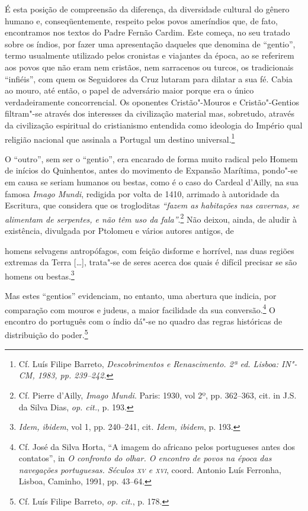 É esta posição de compreensão da diferença, da diversidade cultural
do gênero humano e, conseqüentemente, respeito pelos povos ameríndios
que, de fato, encontramos nos textos do Padre Fernão Cardim. Este
começa, no seu tratado sobre os índios, por fazer uma
apresentação daqueles que denomina de ``gentio'', termo
usualmente utilizado pelos cronistas e viajantes da época, ao se
referirem aos povos que não eram nem cristãos, nem sarracenos ou
turcos, os tradicionais ``infiéis'', com quem os Seguidores da Cruz
lutaram para dilatar a sua fé. Cabia ao mouro, até então, o papel de
adversário maior porque era o único verdadeiramente concorrencial. Os
oponentes Cristão"-Mouros e Cristão"-Gentios filtram"-se
através dos interesses da civilização material mas, sobretudo, através
da civilização espiritual do cristianismo entendida como ideologia do
Império qual religião nacional que assinala a Portugal um
destino universal.\footnote{ Cf. Luís Filipe Barreto,
\textit{Descobrimentos e Renascimento. 2ª ed. Lisboa: IN"-CM, 1983, pp. 239--242.}} 

 O ``outro'', sem ser o ``gentio'', era encarado de forma muito
radical pelo Homem de inícios do Quinhentos, antes do movimento
de Expansão Marítima, pondo"-se em causa se seriam humanos ou bestas,
como é o caso do Cardeal d'Ailly, na sua famosa \textit{Imago Mundi}, 
redigida por volta de 1410, arrimado à autoridade da Escritura, que 
considera que os trogloditas \textit{``fazem as habitações nas cavernas, se
alimentam de serpentes, e não têm uso da fala''}.\footnote{ Cf. Pierre 
d'Ailly, \textit{Imago Mundi}. Paris: 1930, vol 2º, pp. 362--363, cit. in J.S. da Silva Dias,
\textit{op. cit.}, p. 193.} Não deixou, ainda, de aludir à
existência, divulgada por Ptolomeu e vários autores antigos, de

\begin{hedraquote}
[\ldots] homens selvagens antropófagos, com feição disforme e horrível,
nas duas regiões extremas da Terra [\ldots], trata"-se de seres acerca dos
quais é difícil precisar se são homens ou bestas.\footnote{ \textit{Idem, ibidem}, 
vol 1, pp. 240--241, cit. \textit{Idem, ibidem}, p. 193.} 
\end{hedraquote}

Mas estes ``gentios'' evidenciam, no entanto, uma
abertura que indicia, por comparação com mouros e judeus, a maior
facilidade da sua conversão.\footnote{ Cf. José da Silva Horta, 
``A imagem do africano pelos portugueses antes dos contatos'', in
\textit{O confronto do olhar. O encontro de povos na época das
navegações portuguesas. Séculos \textsc{xv} e \textsc{xvi}}, coord. Antonio Luís Ferronha,
Lisboa, Caminho, 1991, pp. 43--64.} O encontro do português com o índio
dá"-se no quadro das regras históricas de distribuição do 
poder.\footnote{ Cf. Luís Filipe Barreto, \textit{op. cit.}, p. 178.}


